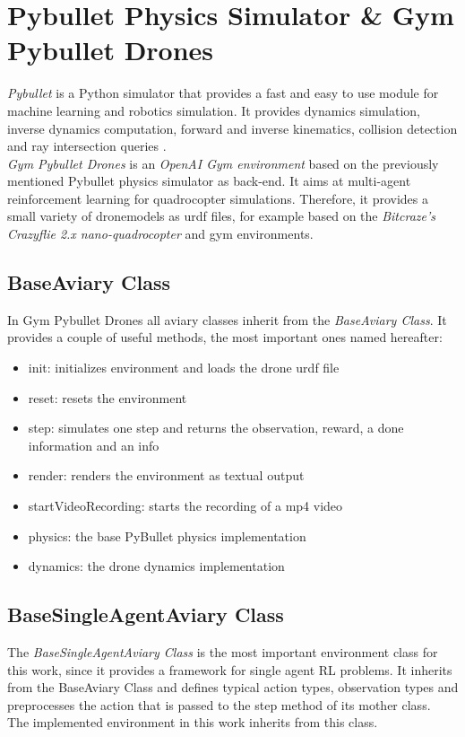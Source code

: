 \newpage

\section{Pybullet Physics Simulator \& Gym Pybullet Drones}
\emph{Pybullet}  is a Python simulator that provides a fast and easy to use module for machine learning and robotics simulation. It provides dynamics simulation, inverse dynamics computation, forward and inverse kinematics, collision detection and ray intersection queries \cite{coumans2021}. \\
\emph{Gym Pybullet Drones} \cite{panerati2021learning} is an \emph{OpenAI Gym environment} based on the previously mentioned Pybullet physics simulator as back-end. It aims at multi-agent reinforcement learning for quadrocopter simulations. Therefore, it provides a small variety of dronemodels as urdf files, for example based on the \emph{Bitcraze's Crazyflie 2.x nano-quadrocopter} and gym environments.\\

\subsection{BaseAviary Class}
In Gym Pybullet Drones all aviary classes inherit from the \emph{BaseAviary Class}. It provides a couple of useful methods, the most important ones named hereafter:
\begin{itemize}
	\item init: initializes environment and loads the drone urdf file
	\item reset: resets the environment
	\item step: simulates one step and returns the observation, reward, a done information and an info
	\item render: renders the environment as textual output
	\item startVideoRecording: starts the recording of a mp4 video
	\item physics: the base PyBullet physics implementation
	\item dynamics: the drone dynamics implementation
\end{itemize}

\subsection{BaseSingleAgentAviary Class}
The \emph{BaseSingleAgentAviary Class} is the most important environment class for this work, since it provides a framework for single agent RL problems. It inherits from the BaseAviary Class and defines typical action types, observation types and preprocesses the action that is passed to the step method of its mother class.\\
The implemented environment in this work inherits from this class.
